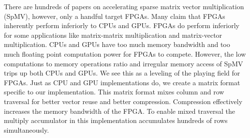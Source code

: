 
There are hundreds of papers on accelerating sparse matrix vector multiplication (SpMV), however, only a handful target FPGAs. Many claim that FPGAs inherently perform inferiorly to CPUs and GPUs. FPGAs do perform inferiorly for some applications like matrix-matrix multiplication and matrix-vector multiplication. CPUs and GPUs have too much memory bandwidth and too much floating point computation power for FPGAs to compete. However, the low computations to memory operations ratio and irregular memory access of SpMV trips up both CPUs and GPUs. We see this as a leveling of the playing field for FPGAs. Just as CPU and GPU implementations do, we create a matrix format specific to our implementation. This matrix format mixes column and row traversal for better vector reuse and better compression. Compression effectively increases the memory bandwidth of the FPGA. To enable mixed traversal the multiply accumulator in this implementation accumulates hundreds of rows simultaneously.
